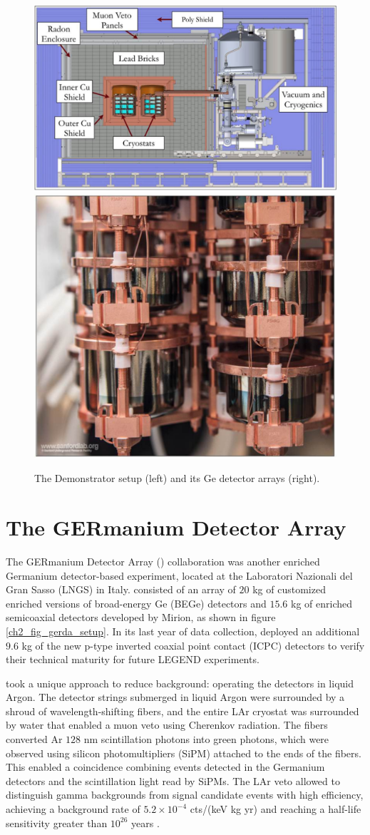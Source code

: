 \begin{figure}
  \centering
  \includegraphics[height=0.34\columnwidth]{ch2/figs/mjd_setup.pdf}
  \qquad
  \includegraphics[height=0.34\columnwidth]{ch2/figs/mjd_ppc_array.pdf}
  \caption{The {\MJ} Demonstrator setup (left) and its Ge detector arrays (right).}
    \label{fig:mjd}
  \end{figure}
 
\section{The GERmanium Detector Array}
The GERmanium Detector Array ({\Gerda}) collaboration was another enriched Germanium detector-based experiment, located at the Laboratori Nazionali del Gran Sasso (LNGS) in Italy. {\Gerda} consisted of an array of $20$ kg of customized enriched versions of broad-energy Ge (BEGe) detectors and $15.6$ kg of enriched semicoaxial detectors developed by Mirion, as shown in figure \ref{ch2_fig_gerda_setup}. In its last year of data collection, {\Gerda} deployed an additional $9.6$ kg of the new p-type inverted coaxial point contact (ICPC) detectors to verify their technical maturity for future LEGEND experiments.

{\Gerda} took a unique approach to reduce background: operating the detectors in liquid Argon. The detector strings submerged in liquid Argon were surrounded by a shroud of wavelength-shifting fibers, and the entire LAr cryostat was surrounded by water that enabled a muon veto using Cherenkov radiation. The fibers converted Ar $128$ nm scintillation photons into green photons, which were observed using silicon photomultipliers (SiPM) attached to the ends of the fibers. This enabled a coincidence combining events detected in the Germanium detectors and the scintillation light read by SiPMs. The LAr veto allowed {\Gerda} to distinguish gamma backgrounds from {\onbb} signal candidate events with high efficiency, achieving a background rate of $5.2\times 10^{-4}$ cts/(keV kg yr) and reaching a half-life sensitivity greater than $10^{26}$ years \cite{GERDA_final}.

